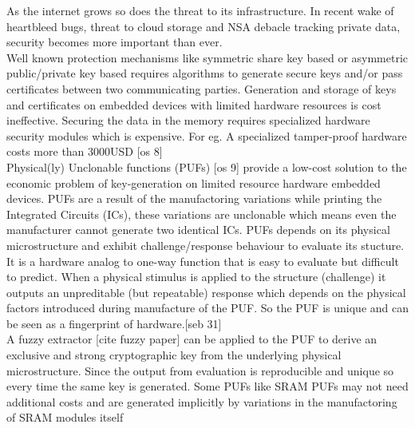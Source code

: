 As the internet grows so does the threat to its infrastructure.
In recent wake of heartbleed bugs, threat to cloud storage and NSA debacle tracking private data, security becomes more important than ever.\\

Well known protection mechanisms like symmetric share key based or asymmetric public/private key based requires algorithms to generate secure keys and/or pass certificates between two communicating parties. Generation and storage of keys and certificates on embedded devices with limited hardware resources is cost ineffective. Securing the data in the memory requires specialized hardware security modules which is expensive. For eg. A specialized tamper-proof hardware costs more than 3000USD [os 8]\\

Physical(ly) Unclonable functions (PUFs) [os 9] provide a low-cost solution to the economic problem of key-generation on limited resource hardware embedded devices. PUFs are a result of the manufactoring variations while printing the Integrated Circuits (ICs), these variations are unclonable which means even the manufacturer cannot generate two identical ICs. PUFs depends on its physical microstructure and exhibit challenge/response behaviour to evaluate its stucture. It is a hardware analog to one-way function that is easy to evaluate but difficult to predict. When a physical stimulus is applied to the structure (challenge) it outputs an unpreditable (but repeatable) response which depends on the physical factors introduced during manufacture of the PUF. So the PUF is unique and can be seen as a fingerprint of hardware.[seb 31]\\

A fuzzy extractor [cite fuzzy paper] can be applied to the PUF to derive an exclusive and strong cryptographic key from the underlying physical microstructure. Since the output from evaluation is reproducible and unique so every time the same key is generated. Some PUFs like SRAM PUFs may not need additional costs and are generated implicitly by variations in the manufactoring of SRAM modules itself\\


